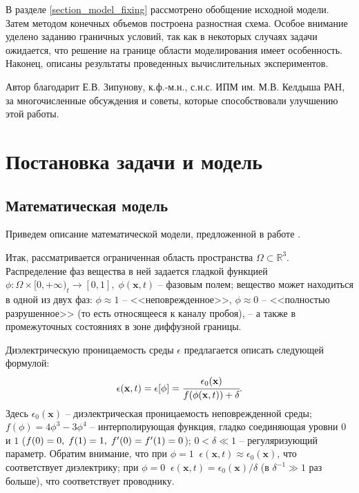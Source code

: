 \documentclass[a4paper,12pt]{article}
\newcommand*{\hm}[1]{#1\nobreak\discretionary{}
{\hbox{$\mathsurround=0pt #1$}}{}}
\theoremstyle{plain}
\theoremstyle{definition}
\begin{document}
В разделе \ref{section_model_fixing} рассмотрено обобщение исходной модели. Затем методом конечных объемов построена разностная схема. Особое внимание уделено заданию граничных условий, так как в некоторых случаях задачи ожидается, что решение на границе области моделирования имеет особенность. Наконец, описаны результаты проведенных вычислительных экспериментов.

Автор благодарит Е.В. Зипунову, к.ф.-м.н., с.н.с. ИПМ им. М.В. Келдыша РАН, за многочисленные обсуждения и советы, которые способствовали улучшению этой работы.


\section{Постановка задачи и модель}
\label{section_problem_and_model}

\subsection{Математическая модель}

Приведем описание математической модели, предложенной в работе \cite{zipunova_higher_codimension}.

Итак, рассматривается ограниченная область пространства $\Omega \subset \mathbb{R}^3$. Распределение фаз вещества в ней задается гладкой функцией $\phi: \Omega \times [0, +\infty)_t \to [0, 1], \; \phi(\mathbf{x}, t)$ -- фазовым полем; вещество может находиться в одной из двух фаз: $\phi \approx 1$ -- <<неповрежденное>>, $\phi \approx 0$ -- <<полностью разрушенное>> (то есть относящееся к каналу пробоя), -- а также в промежуточных состояниях в зоне диффузной границы.

Диэлектрическую проницаемость среды $\epsilon$ предлагается описать следующей формулой:
\begin{equation}
    \epsilon(\mathbf{x}, t) = \epsilon[\phi] = \cfrac{\epsilon_0(\mathbf{x})}{f(\phi(\mathbf{x}, t)) + \delta} \text{.}
    \label{equation_epsilon}
\end{equation}
Здесь $\epsilon_0(\mathbf{x})$ -- диэлектрическая проницаемость неповрежденной среды; $f(\phi) = 4\phi^3 - 3\phi^4$ -- интерполирующая функция, гладко соединяющая уровни $0$ и $1$ ($f(0) = 0, \; f(1) \hm = 1, \; f'(0) = f'(1) = 0$); $0 < \delta \ll 1$ -- регуляризующий параметр. Обратим внимание, что при $\phi = 1 \;\; \epsilon(\mathbf{x}, t) \approx \epsilon_0(\mathbf{x})$, что соответствует диэлектрику; при $\phi = 0 \;\; \epsilon(\mathbf{x}, t) = \epsilon_0(\mathbf{x})/\delta$ \linebreak (в $\delta^{-1} \gg 1$ раз больше), что соответствует проводнику.
\end{document}
